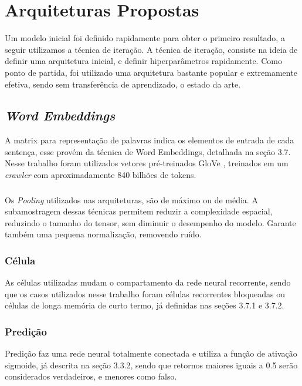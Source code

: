\documentclass[12pt]{article}
\begin{document}
\section{Arquiteturas Propostas}

Um modelo inicial foi definido rapidamente para obter o primeiro resultado, a seguir utilizamos a técnica de iteração. A técnica de iteração, consiste na ideia de definir uma arquitetura inicial, e definir hiperparâmetros rapidamente. Como ponto de partida, foi utilizado uma arquitetura bastante popular e extremamente efetiva, sendo sem transferência de aprendizado, o estado da arte.

\subsection{\textit{Word Embeddings}}

A matrix para representação de palavras indica os elementos de entrada de cada sentença, esse provém da técnica de Word Embeddings, detalhada na seção 3.7. Nesse trabalho foram utilizados vetores pré-treinados GloVe \cite{pennington2014glove}, treinados em um \textit{crawler} com aproximadamente 840 bilhões de tokens.

\subsubsection{}

Os \textit{Pooling} utilizados nas arquiteturas, são de máximo ou de média. A subamostragem dessas técnicas permitem reduzir a complexidade espacial, reduzindo o tamanho do tensor, sem diminuir o desempenho do modelo. Garante também uma pequena normalização, removendo ruído.

\subsubsection{Célula}

As células utilizadas mudam o compartamento da rede neural recorrente, sendo que os casos utilizados nesse trabalho foram células recorrentes bloqueadas ou células de longa memória de curto termo, já definidas nas seções 3.7.1 e 3.7.2.

\subsubsection{Predição}

Predição faz uma rede neural totalmente conectada e utiliza a função de ativação sigmoide, já descrita na seção 3.3.2,  sendo que retornos maiores iguais a 0.5 serão considerados verdadeiros, e menores como falso.
\end{document}
